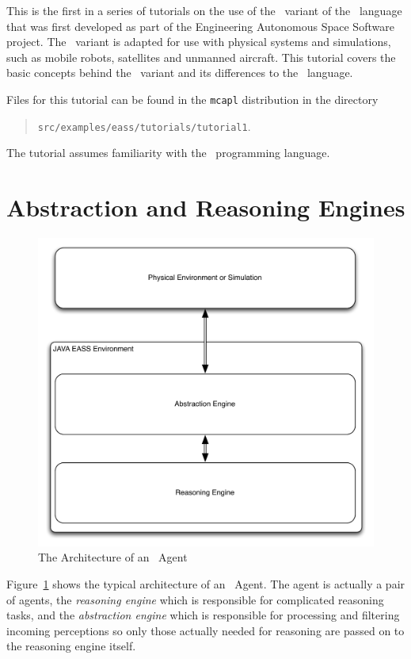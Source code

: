 
This is the first in a series of tutorials on the use of the \eass\ variant of the \gwendolen\ language that was first developed as part of the Engineering Autonomous Space Software project.  The \eass\ variant is adapted for use with physical systems and simulations, such as mobile robots, satellites and unmanned aircraft.  This tutorial covers the basic concepts behind the \eass\ variant and its differences to the \gwendolen\ language.  

Files for this tutorial can be found in the \texttt{mcapl} distribution in the directory 
\begin{quote}
\texttt{src/examples/eass/tutorials/tutorial1}.
\end{quote}

The tutorial assumes familiarity with the \gwendolen\ programming language.

\section{Abstraction and Reasoning Engines}

\begin{figure}[htb]
\includegraphics[width=\textwidth]{images/arch.pdf}
\caption{The Architecture of an \eass\ Agent}
\label{fig:arch}
\end{figure}
Figure~\ref{fig:arch} shows the typical architecture of an \eass\ Agent.  The agent is actually a pair of agents, the \emph{reasoning engine} which is responsible for complicated reasoning tasks, and the \emph{abstraction engine} which is responsible for processing and filtering incoming perceptions so only those actually needed for reasoning are passed on to the reasoning engine itself.


